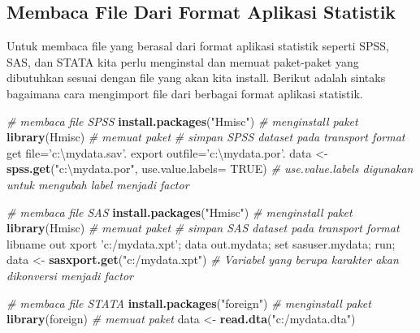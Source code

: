 \documentclass[]{book}
\newenvironment{Shaded}{\begin{snugshade}}{\end{snugshade}}
\newcommand{\KeywordTok}[1]{\textcolor[rgb]{0.13,0.29,0.53}{\textbf{#1}}}
\newcommand{\DataTypeTok}[1]{\textcolor[rgb]{0.13,0.29,0.53}{#1}}
\newcommand{\StringTok}[1]{\textcolor[rgb]{0.31,0.60,0.02}{#1}}
\newcommand{\CommentTok}[1]{\textcolor[rgb]{0.56,0.35,0.01}{\textit{#1}}}
\newcommand{\OtherTok}[1]{\textcolor[rgb]{0.56,0.35,0.01}{#1}}
\newcommand{\NormalTok}[1]{#1}
\begin{document}
\subsection{Membaca File Dari Format Aplikasi
Statistik}\label{membaca-file-dari-format-aplikasi-statistik}

Untuk membaca file yang berasal dari format aplikasi statistik seperti
SPSS, SAS, dan STATA kita perlu menginstal dan memuat paket-paket yang
dibutuhkan sesuai dengan file yang akan kita install. Berikut adalah
sintaks bagaimana cara mengimport file dari berbagai format aplikasi
statistik.

\begin{Shaded}
\begin{Highlighting}[]
\CommentTok{# membaca file SPSS}
\KeywordTok{install.packages}\NormalTok{(}\StringTok{"Hmisc"}\NormalTok{) }\CommentTok{# menginstall paket}
\KeywordTok{library}\NormalTok{(Hmisc) }\CommentTok{# memuat paket}
\CommentTok{# simpan SPSS dataset pada transport format}
\NormalTok{get file=}\StringTok{'c:\textbackslash{}mydata.sav'}\NormalTok{.}
\NormalTok{export outfile=}\StringTok{'c:\textbackslash{}mydata.por'}\NormalTok{. }
\NormalTok{data <-}\StringTok{ }\KeywordTok{spss.get}\NormalTok{(}\StringTok{"c:\textbackslash{}mydata.por"}\NormalTok{, }\DataTypeTok{use.value.labels=} \OtherTok{TRUE}\NormalTok{) }
\CommentTok{# use.value.labels digunakan untuk mengubah label menjadi factor}


\CommentTok{# membaca file SAS}
\KeywordTok{install.packages}\NormalTok{(}\StringTok{"Hmisc"}\NormalTok{) }\CommentTok{# menginstall paket}
\KeywordTok{library}\NormalTok{(Hmisc) }\CommentTok{# memuat paket}
\CommentTok{# simpan SAS dataset pada transport format}
\NormalTok{libname out xport }\StringTok{'c:/mydata.xpt'}\NormalTok{;}
\NormalTok{data out.mydata;}
\NormalTok{set sasuser.mydata;}
\NormalTok{run;}
\NormalTok{data <-}\StringTok{ }\KeywordTok{sasxport.get}\NormalTok{(}\StringTok{"c:/mydata.xpt"}\NormalTok{) }
\CommentTok{# Variabel yang berupa karakter akan dikonversi menjadi factor}


\CommentTok{# membaca file STATA}
\KeywordTok{install.packages}\NormalTok{(}\StringTok{"foreign"}\NormalTok{) }\CommentTok{# menginstall paket}
\KeywordTok{library}\NormalTok{(foreign) }\CommentTok{# memuat paket}
\NormalTok{data <-}\StringTok{ }\KeywordTok{read.dta}\NormalTok{(}\StringTok{"c:/mydata.dta"}\NormalTok{)}
\end{Highlighting}
\end{Shaded}
\end{document}
